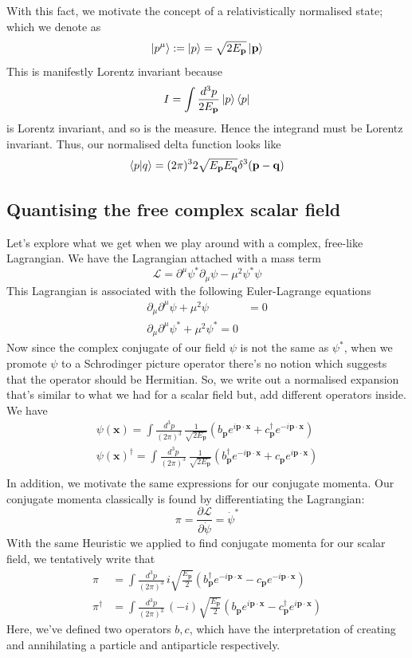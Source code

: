 \documentclass[11pt, oneside]{article}   	%
\theoremstyle{newline}
\theoremstyle{newline}
\theoremstyle{newline}
\theoremstyle{newline}
\theoremstyle{newline}
\newcommand{\Lagr}{\mathcal{L}}
\newcommand{\intp}{ \int \frac{ d^3 p }{ (2 \pi)^3 } \, }
\newcommand{\ve}[1]{ \mathbf{ #1 } }
\newcommand{\mode}[ 1]{ e^{ i \mathbf{ #1 } \cdot \mathbf{x} }}
\newcommand{\nmode}[1]{ e^{  - i \mathbf{ #1 } \cdot \mathbf{x} }}
\newcommand{\anop}[2]{ #1_\mathbf{#2}}
\newcommand{\crop}[2]{#1_\mathbf{#2}^\dagger}
\begin{document}
With this fact, we motivate the concept of a relativistically normalised state; which we denote as 
\[ 	
\ket{ p^\mu }  : = \ket{ p } = \sqrt{ 2 E_\ve{ p } } \ket{ \ve{ p } } 
\] This is manifestly Lorentz invariant because  
\[ 
I = \int \frac { d^3 p }{ 2 E_\ve{p} } \ket{ p }\bra{p } 
\] is Lorentz invariant, and so is the measure. Hence the integrand must be Lorentz invariant. Thus, our normalised delta function looks like 
\[ 
\bra{ p}\ket{ q} = ( 2 \pi )^3 2 \sqrt{ E_\ve{ p} E_\ve{ q} } \delta^3 ( \ve{ p - q} ) 
\] 

\pagebreak
\subsection{Quantising the free complex scalar field} 
Let's explore what we get when we play around with a complex, free-like Lagrangian. We have the Lagrangian attached with a mass term
\[ 
\Lagr = \partial^\mu \psi^* \partial _\mu \psi - \mu^2 \psi^* \psi 
\] This Lagrangian is associated with the following Euler-Lagrange equations 
\begin{align*} 	
\partial_\mu \partial^\mu \psi + \mu^2 \psi &= 0 \\
\partial_\mu \partial^\mu \psi^* + \mu^2 \psi^* = 0 
\end{align*} 
Now since the complex conjugate of our field $\psi$ is not the same as $\psi^*$, when we promote $\psi$ to a Schrodinger picture operator there's no notion which suggests that the operator should be Hermitian. So, we write out a normalised expansion that's similar to what we had for a scalar field but, add different operators inside. We have 
\begin{align*} 
\psi( \ve{ x} ) = \intp \frac{ 1 }{ \sqrt{ 2 E_\ve{p} } } ( \anop{ b }{ p } \mode{p}  + \crop{c}{ p } \nmode{p}) \\
\psi(\ve{ x} )^\dagger  = \intp \frac{ 1 }{ \sqrt{ 2 E_\ve{p} } } ( \crop{b}{ p} \nmode{p}  + \anop{c}{ p} \mode{p} ) \\
\end{align*} In addition, we motivate the same expressions for our conjugate momenta. Our conjugate momenta classically is found by differentiating the Lagrangian: 
\[ 	
\pi = \frac{ \partial \Lagr }{ \partial \dot{ \psi } }  = \dot{ \psi}^* 
\] With the same Heuristic we applied to find conjugate momenta for our scalar field, we tentatively write that 
\begin{align*} 
\pi & = \intp i \sqrt{ \frac{ E_\ve{ p } }{ 2 } } ( \crop{ b }{ p } \nmode{p}  - \anop{c}{ p } \nmode{ p })  \\
\pi^\dagger &= \intp ( -i ) \sqrt{ \frac{ E_\ve{ p} } { 2} } ( \anop{b}{ p} \mode{p}  - \crop{c}{ p} \mode{ p} ) 
\end{align*} Here, we've defined two operators $b, c$, which have the interpretation of creating and annihilating a particle and antiparticle respectively. 
\end{document}

